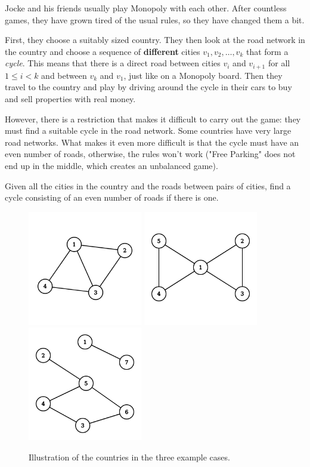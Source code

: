\noindent
Jocke and his friends usually play Monopoly with each other.
After countless games, they have grown tired of the usual rules, so they have changed them a bit.

First, they choose a suitably sized country.
They then look at the road network in the country and choose a sequence of \textbf{different} cities $v_1, v_2, \dots, v_k$ that form a \emph{cycle}.
This means that there is a direct road between cities $v_i$ and $v_{i+1}$ for all $1 \le i < k$ and between $v_k$ and $v_1$, just like on a Monopoly board.
Then they travel to the country and play by driving around the cycle in their cars to buy and sell properties with real money.

However, there is a restriction that makes it difficult to carry out the game: they must find a suitable cycle in the road network.
Some countries have very large road networks.
What makes it even more difficult is that the cycle must have an even number of roads, otherwise, the rules won't work ("Free Parking" does not end up in the middle, which creates an unbalanced game).

Given all the cities in the country and the roads between pairs of cities, find a cycle consisting of an even number of roads if there is one.

\begin{figure}[!h]
  \centering
  \includegraphics[width=5cm]{sample1.png}
  \quad
  \includegraphics[width=5cm]{sample2.png}
  \quad
  \includegraphics[width=5cm]{sample3.png}
  \caption{Illustration of the countries in the three example cases.}
\end{figure}

